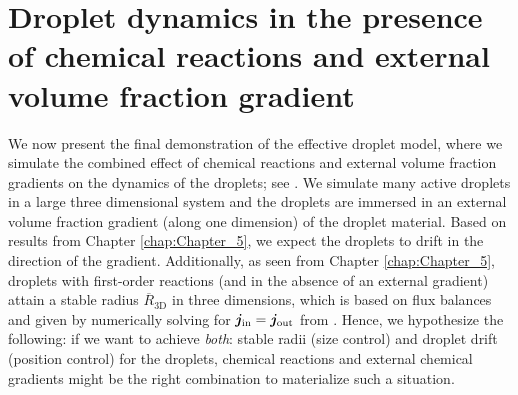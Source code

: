 \section{Droplet dynamics in the presence of chemical reactions and external volume fraction gradient}

We now present the final demonstration of the effective droplet model, where we simulate the combined effect of chemical reactions and external volume fraction gradients on the dynamics of the droplets; see .
We simulate many active droplets in a large three dimensional system and the droplets are immersed in an external volume fraction gradient (along one dimension) of the droplet material.
Based on results from Chapter \ref{chap:Chapter_5}, we expect the droplets to drift in the direction of the gradient.
Additionally, as seen from Chapter \ref{chap:Chapter_5}, droplets with first-order reactions (and in the absence of an external gradient) attain a stable radius $\overline{R}_\mathrm{3D}$ in three dimensions, which is based on flux balances and given by numerically solving for $\boldsymbol{j}_\mathrm{in} = \boldsymbol{j}_\mathrm{out}$ from .
Hence, we hypothesize the following: if we want to achieve \textit{both}: stable radii (size control) and droplet drift (position control) for the droplets, chemical reactions and external chemical gradients might be the right combination to materialize such a situation. 


